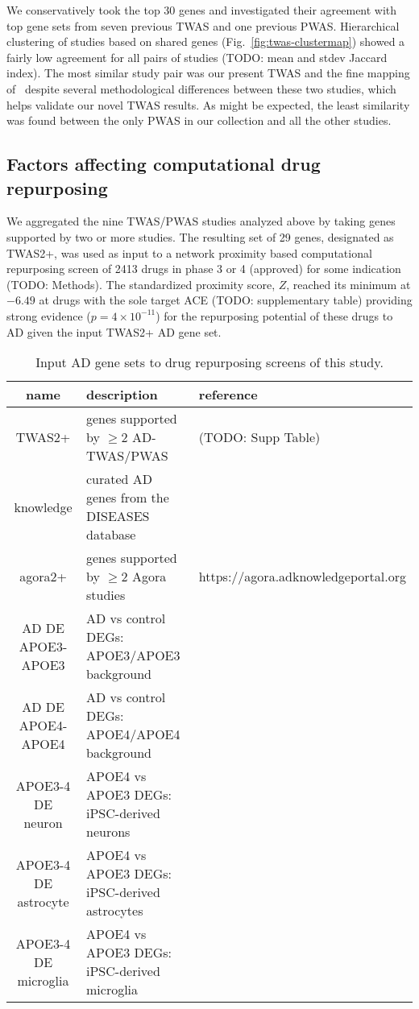 \documentclass[letterpaper]{article}
\begin{document}
We conservatively took the top 30 genes and investigated their agreement with
top gene sets from seven previous TWAS and one previous PWAS.  Hierarchical
clustering of studies based on shared genes (Fig.~\ref{fig:twas-clustermap})
showed a fairly low agreement for all pairs of studies (TODO: mean and stdev
Jaccard index).  The most similar study pair was our present TWAS and the fine
mapping of~\cite{Jansen2019} despite several methodological differences
between these two studies, which helps validate our novel TWAS results.  As
might be expected, the least similarity was found between the only PWAS in our
collection and all the other studies.

\subsection{Factors affecting computational drug repurposing}

We aggregated the nine TWAS/PWAS studies analyzed above by taking genes
supported by two or more studies.  The resulting set of 29 genes, designated
as TWAS2+, was used as input to a network proximity based computational
repurposing screen of 2413 drugs in phase 3 or 4 (approved) for some
indication (TODO: Methods).  The standardized proximity score, $Z$, reached
its minimum at $-6.49$ at drugs with the sole target ACE (TODO: supplementary
table) providing strong evidence ($p=4\times 10^{-11}$) for the repurposing
potential of these drugs to AD given the input TWAS2+ AD gene set.

\begin{table}
\footnotesize
\begin{tabular}{cll}
name     & description & reference  \\
\hline
TWAS2+   & genes supported by $\ge 2$ AD-TWAS/PWAS & (TODO: Supp Table)  \\
knowledge& curated AD genes from the DISEASES database & \cite{PletscherFrankild2015} \\
agora2+  & genes supported by $\ge 2$ Agora studies & https://agora.adknowledgeportal.org \\
AD DE APOE3-APOE3 & AD vs control DEGs: APOE3/APOE3 background & \cite{Taubes2021} \\
AD DE APOE4-APOE4 & AD vs control DEGs: APOE4/APOE4 background & \cite{Taubes2021} \\
APOE3-4 DE neuron & APOE4 vs APOE3 DEGs: iPSC-derived neurons& \cite{Lin2018} \\
APOE3-4 DE astrocyte & APOE4 vs APOE3 DEGs: iPSC-derived astrocytes& \cite{Lin2018} \\
APOE3-4 DE microglia & APOE4 vs APOE3 DEGs: iPSC-derived microglia& \cite{Lin2018} \\
\end{tabular}
\caption{
Input AD gene sets to drug repurposing screens of this study.
}
\label{tab:genesets}
\end{table}
\end{document}
